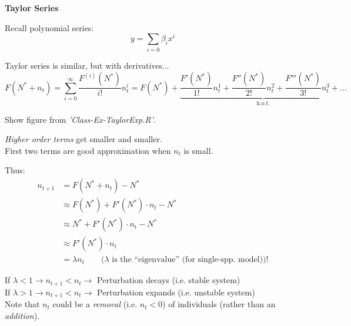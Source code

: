 \documentclass{article}
\newcommand{\note}[1]{\colorbox{gray!30}{#1}}
\newcommand{\ind}{\-\hspace{1cm}}
\begin{document}
\textbf{Taylor Series}

Recall polynomial series:
\begin{equation*}
	y=\sum_{i=0}\beta_i x^i
\end{equation*}

Taylor series is similar, but with derivatives...
\begin{equation*}
	F(N^*+n_t)= \sum_{i=0}^\infty \frac{F^{(i)}(N^*)}{i!}n_t^i = F(N^*) + \underbrace{\frac{F'(N^*)}{1!}n_t^1 + \frac{F''(N^*)}{2!} n_t^2 + \frac{F'''(N^*) }{3!}n_t^3 + ...}_{\text{h.o.t.}}
\end{equation*}

\begin{center}
\note{Show figure from \emph{'Class-Ex-TaylorExp.R'}.}
\end{center}

\emph{Higher order terms} get smaller and smaller.\\
First two terms are good approximation when $n_t$ is small.

Thus:
\begin{align*}
	n_{t+1}& =F(N^*+n_t)-N^*\\
	& \approx F(N^*)+F'(N^*) \cdot n_t - N^*\\
	& \approx N^* + F'(N^*) \cdot n_t - N^*\\
	& \approx F'(N^*) \cdot n_t \\
	& = \lambda n_t \quad \quad (\lambda \text{ is the ``eigenvalue'' (for single-spp. model))!}
\end{align*}

\vspace{1cm}

\ind \ind \ind If $\lambda <1 \to n_{t+1} < n_t \to $ Perturbation decays (i.e. stable system)\\
\ind \ind \ind If $\lambda > 1 \to n_{t+1} < n_t \to $ Perturbation expands (i.e. unstable system)\\

Note that $n_t$ could be a \emph{removal} (i.e. $n_t<0$) of individuals (rather than an \emph{addition}).\\
\end{document}
